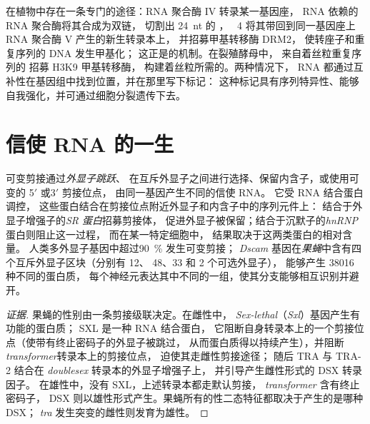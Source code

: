 \begin{proposition}\label{prop:b3:rna-regulation:rddm}
在植物中存在一条专门的途径：RNA 聚合酶 IV 转录某一基因座，
RNA 依赖的 RNA 聚合酶将其合成为双链，
 切割出 \qty{24}{nt} 的 ，
~4 将其带回到同一基因座上 RNA 聚合酶 V 产生的新生转录本上，
并招募甲基转移酶 DRM2，
使转座子和重复序列的 DNA 发生甲基化；
这正是的机制。在裂殖酵母中，
来自着丝粒重复序列的  招募 H3K9 甲基转移酶，
构建着丝粒所需的。两种情况下，
RNA 都通过互补性在基因组中找到位置，并在那里写下标记：
这种标记具有序列特异性、能够自我强化，并可通过细胞分裂遗传下去。
\end{proposition}

\section{信使 RNA 的一生}

\begin{definition}[调控性剪接]\label{def:b3:rna-regulation:splicing}
可变剪接通过\emph{外显子跳跃}、
在互斥外显子之间进行选择、保留内含子，或使用可变的 5$'$ 或3$'$ 剪接位点，
由同一基因产生不同的信使 RNA。
它受 RNA 结合蛋白调控，
这些蛋白结合在剪接位点附近外显子和内含子中的序列元件上：
结合于外显子增强子的\emph{SR 蛋白}招募剪接体，
促进外显子被保留；结合于沉默子的\emph{hnRNP}蛋白则阻止这一过程，
而在某一特定细胞中，
结果取决于这两类蛋白的相对含量。
人类多外显子基因中超过\qty{90}{\%} 发生可变剪接；
\emph{Dscam} 基因在\emph{果蝇}中含有四个互斥外显子区块（分别有 12、
48、33 和 2 个可选外显子），
能够产生 \num{38016} 种不同的蛋白质，
每个神经元表达其中不同的一组，使其分支能够相互识别并避开。
\end{definition}

\begin{proof}[证据]
果蝇的性别由一条剪接级联决定。在雌性中，
\emph{Sex-lethal}（\emph{Sxl}）基因产生有功能的蛋白质；
SXL 是一种 RNA 结合蛋白，
它阻断自身转录本上的一个剪接位点（使带有终止密码子的外显子被跳过，
从而蛋白质得以持续产生），并阻断 \emph{transformer}转录本上的剪接位点，
迫使其走雌性剪接途径；
随后 TRA 与 TRA-2 结合在 \emph{doublesex} 转录本的外显子增强子上，
并引导产生雌性形式的 DSX 转录因子。
在雄性中，没有 SXL，上述转录本都走默认剪接，
\emph{transformer} 含有终止密码子，
DSX 则以雄性形式产生。果蝇所有的性二态特征都取决于产生的是哪种 DSX；
\emph{tra} 发生突变的雌性则发育为雄性。
\end{proof}

